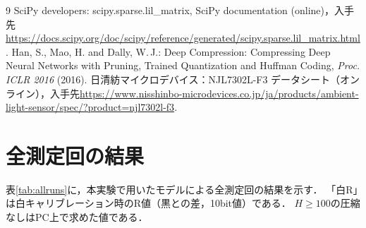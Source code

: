 \documentclass[a4paper,11pt,uplatex,dvipdfmx]{jsarticle}
\begin{document}
\begin{thebibliography}{9}
 SciPy developers: scipy.sparse.lil\_matrix, SciPy documentation (online)，入手先\url{https://docs.scipy.org/doc/scipy/reference/generated/scipy.sparse.lil_matrix.html}.
 Han, S., Mao, H. and Dally, W.\,J.: Deep Compression: Compressing Deep Neural Networks with Pruning, Trained Quantization and Huffman Coding, \textit{Proc. ICLR 2016} (2016).
 日清紡マイクロデバイス：NJL7302L-F3 データシート（オンライン），入手先\url{https://www.nisshinbo-microdevices.co.jp/ja/products/ambient-light-sensor/spec/?product=njl7302l-f3}.
\end{thebibliography}

\appendix
\section{全測定回の結果}
表\ref{tab:allruns}に，本実験で用いたモデルによる全測定回の結果を示す．
「白R」は白キャリブレーション時のR値（黒との差，10bit値）である．
$H \geq 100$の圧縮なしはPC上で求めた値である．
\end{document}
